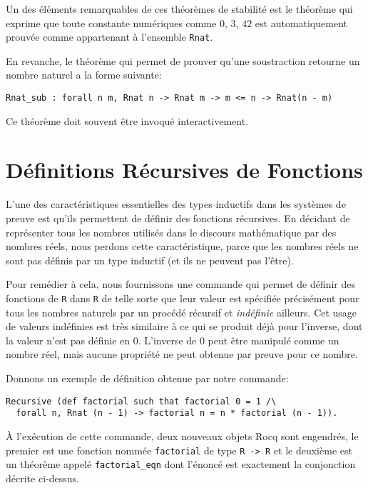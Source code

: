 \documentclass{modjflart}
\begin{document}
Un des éléments remarquables de ces théorèmes de stabilité est le théorème
qui exprime que toute constante numériques comme \(0\), \(3\), \(42\) est
automatiquement prouvée comme appartenant à l'ensemble \texttt{Rnat}.

En revanche, le théorème qui permet de prouver qu'une soustraction retourne un
nombre naturel a la forme suivante:
\begin{verbatim}
Rnat_sub : forall n m, Rnat n -> Rnat m -> m <= n -> Rnat(n - m)
\end{verbatim}
Ce théorème doit souvent être invoqué interactivement.
\section{Définitions Récursives de Fonctions}
L'une des caractéristiques essentielles des types inductifs dans les
systèmes de preuve est qu'ils permettent de définir des fonctions
récursives.  En décidant de représenter tous les nombres utilisés dans
le discours mathématique par des nombres réels, nous perdons cette
caractéristique, parce que les nombres réels ne sont pas définis par
un type inductif (et ils ne peuvent pas l'être).

Pour remédier à cela, nous fournissons une commande qui permet de
définir des fonctions de \texttt{R} dans \texttt{R} de telle sorte que leur
valeur est spécifiée précisément pour tous les nombres naturels par un
procédé récursif et {\em indéfinie} ailleurs.  Cet usage de valeurs
indéfinies est très similaire à ce qui se produit déjà pour l'inverse, dont
la valeur n'est pas définie en 0.  
L'inverse de 0 peut être manipulé comme un nombre réel, mais aucune
propriété ne peut obtenue par preuve pour ce nombre.

Donnons un exemple de définition obtenue par notre commande:
\begin{verbatim}
Recursive (def factorial such that factorial 0 = 1 /\
  forall n, Rnat (n - 1) -> factorial n = n * factorial (n - 1)).
\end{verbatim}
À l'exécution de cette commande, deux nouveaux objets Rocq sont
engendrés, le premier est une fonction nommée \texttt{factorial} de
type \texttt{R -> R} et le
deuxième est un théorème appelé \texttt{factorial\_eqn} dont l'énoncé
est exactement la conjonction décrite ci-dessus.
\end{document}
